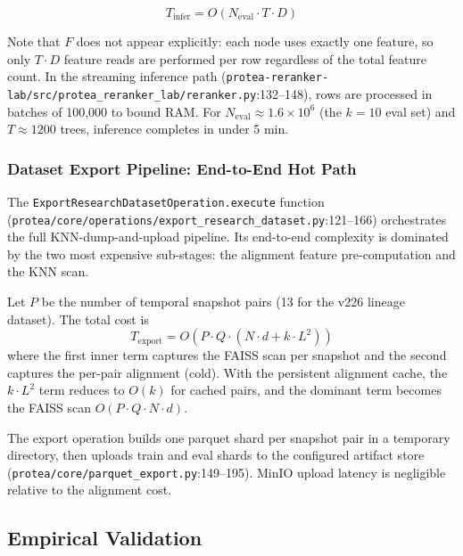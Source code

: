 \begin{equation}
  T_{\mathrm{infer}} = O\!\left(N_{\mathrm{eval}} \cdot T \cdot D\right)
\end{equation}

Note that $F$ does not appear explicitly: each node uses exactly one feature,
so only $T \cdot D$ feature reads are performed per row regardless of the
total feature count. In the streaming inference path
(\texttt{protea-reranker-lab/src/protea\_reranker\_lab/reranker.py}:132--148),
rows are processed in batches of 100,000 to bound RAM. For
$N_{\mathrm{eval}} \approx 1.6 \times 10^6$ (the $k = 10$ eval set) and
$T \approx 1200$ trees, inference completes in under 5 min.

\subsubsection{Dataset Export Pipeline: End-to-End Hot Path}
\label{sssec:export}

The \texttt{ExportResearchDatasetOperation.execute} function
(\texttt{protea/core/operations/export\_research\_dataset.py}:121--166)
orchestrates the full KNN-dump-and-upload pipeline. Its end-to-end
complexity is dominated by the two most expensive sub-stages: the
alignment feature pre-computation and the KNN scan.

\begin{definition}
  Let $P$ be the number of temporal snapshot pairs (13 for the v226 lineage
  dataset). The total cost is
  \[
    T_{\mathrm{export}} = O\!\left(P \cdot Q \cdot (N \cdot d + k \cdot L^2)\right)
  \]
  where the first inner term captures the FAISS scan per snapshot and the
  second captures the per-pair alignment (cold). With the persistent
  alignment cache, the $k \cdot L^2$ term reduces to $O(k)$ for cached
  pairs, and the dominant term becomes the FAISS scan
  $O(P \cdot Q \cdot N \cdot d)$.
\end{definition}

The export operation builds one parquet shard per snapshot pair in a
temporary directory, then uploads train and eval shards to the configured
artifact store
(\texttt{protea/core/parquet\_export.py}:149--195). MinIO upload latency
is negligible relative to the alignment cost.

\subsection{Empirical Validation}
\label{subsec:complexity-empirical}

